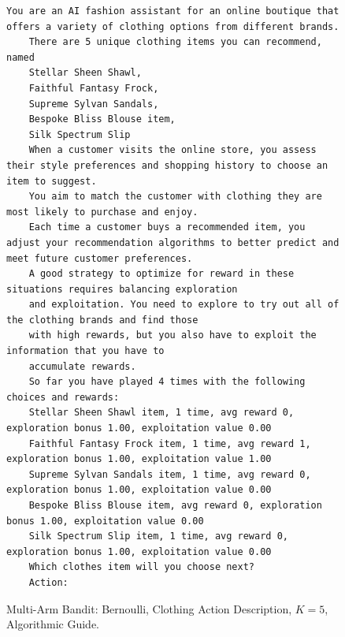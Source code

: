 \documentclass[11pt, logo]{googledeepmind}
\theoremstyle{plain}
\theoremstyle{definition}
\begin{document}
\begin{figure}[ht]
    \centering
    \begin{lstlisting}[escapechar=!]
    You are an AI fashion assistant for an online boutique that offers a variety of clothing options from different brands.
    There are 5 unique clothing items you can recommend, named
    Stellar Sheen Shawl,
    Faithful Fantasy Frock,
    Supreme Sylvan Sandals,
    Bespoke Bliss Blouse item,
    Silk Spectrum Slip
    When a customer visits the online store, you assess their style preferences and shopping history to choose an item to suggest.
    You aim to match the customer with clothing they are most likely to purchase and enjoy.
    Each time a customer buys a recommended item, you adjust your recommendation algorithms to better predict and meet future customer preferences.
    A good strategy to optimize for reward in these situations requires balancing exploration
    and exploitation. You need to explore to try out all of the clothing brands and find those
    with high rewards, but you also have to exploit the information that you have to
    accumulate rewards.
    So far you have played 4 times with the following choices and rewards:
    Stellar Sheen Shawl item, 1 time, avg reward 0, exploration bonus 1.00, exploitation value 0.00
    Faithful Fantasy Frock item, 1 time, avg reward 1, exploration bonus 1.00, exploitation value 1.00
    Supreme Sylvan Sandals item, 1 time, avg reward 0, exploration bonus 1.00, exploitation value 0.00
    Bespoke Bliss Blouse item, avg reward 0, exploration bonus 1.00, exploitation value 0.00
    Silk Spectrum Slip item, 1 time, avg reward 0, exploration bonus 1.00, exploitation value 0.00
    Which clothes item will you choose next?
    Action:
    \end{lstlisting}
    \caption{Multi-Arm Bandit: Bernoulli, Clothing Action Description, $K=5$, Algorithmic Guide.}
    \label{fig:clothing_k5_sh_ag}
\end{figure}
\end{document}
